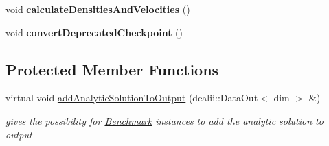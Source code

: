 \begin{DoxyCompactItemize}
\item 
\hypertarget{classnatrium_1_1CFDSolver_a3bad216de02aadc0892500a506278bea}{
void {\bfseries calculateDensitiesAndVelocities} ()}
\label{classnatrium_1_1CFDSolver_a3bad216de02aadc0892500a506278bea}

\item 
\hypertarget{classnatrium_1_1CFDSolver_a99345508302dadfe261795c05154dbcf}{
void {\bfseries convertDeprecatedCheckpoint} ()}
\label{classnatrium_1_1CFDSolver_a99345508302dadfe261795c05154dbcf}

\end{DoxyCompactItemize}
\subsection*{Protected Member Functions}
\begin{DoxyCompactItemize}
\item 
\hypertarget{classnatrium_1_1CFDSolver_a9107b3f462bddc5b7988ec93f78797c2}{
virtual void \hyperlink{classnatrium_1_1CFDSolver_a9107b3f462bddc5b7988ec93f78797c2}{addAnalyticSolutionToOutput} (dealii::DataOut$<$ dim $>$ \&)}
\label{classnatrium_1_1CFDSolver_a9107b3f462bddc5b7988ec93f78797c2}

\begin{DoxyCompactList}\small\item\em gives the possibility for \hyperlink{classnatrium_1_1Benchmark}{Benchmark} instances to add the analytic solution to output \item\end{DoxyCompactList}\end{DoxyCompactItemize}
